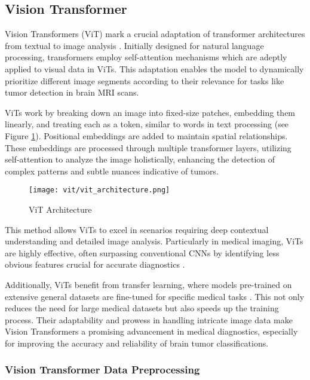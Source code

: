 \subsection{Vision Transformer}\label{s:vit}

Vision Transformers (ViT) mark a crucial adaptation of transformer architectures from textual to image analysis \cite{Khan2021Transformers}. Initially designed for natural language processing, transformers employ self-attention mechanisms which are adeptly applied to visual data in ViTs. This adaptation enables the model to dynamically prioritize different image segments according to their relevance for tasks like tumor detection in brain MRI scans.

ViTs work by breaking down an image into fixed-size patches, embedding them linearly, and treating each as a token, similar to words in text processing \cite{Wu2020Visual} (see Figure \ref{fig:vit_architecture}). Positional embeddings are added to maintain spatial relationships. These embeddings are processed through multiple transformer layers, utilizing self-attention to analyze the image holistically, enhancing the detection of complex patterns and subtle nuances indicative of tumors.

\begin{figure}[H]
  \centering
  \texttt{[image: vit/vit\_architecture.png]}
  \caption{ViT Architecture \cite{curroncol29100590}}
  \label{fig:vit_architecture}
\end{figure}

This method allows ViTs to excel in scenarios requiring deep contextual understanding and detailed image analysis. Particularly in medical imaging, ViTs are highly effective, often surpassing conventional CNNs by identifying less obvious features crucial for accurate diagnostics \cite{Matsoukas2021Is}.

Additionally, ViTs benefit from transfer learning, where models pre-trained on extensive general datasets are fine-tuned for specific medical tasks \cite{Simon2022Vision}. This not only reduces the need for large medical datasets but also speeds up the training process. Their adaptability and prowess in handling intricate image data make Vision Transformers a promising advancement in medical diagnostics, especially for improving the accuracy and reliability of brain tumor classifications.

\subsubsection{Vision Transformer Data Preprocessing}

